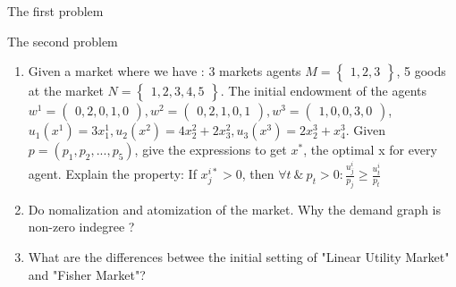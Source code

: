 
\theoremstyle{definition}
\usepackage[margin=1in]{geometry}
\newcommand{\br}{{\sf 2D-BROUWER}}
\newcommand{\brs}{{\sf 2D-BROUWER*}}

\def\duedate{Submit on 23:59:59 November 7, 2017}

\midterm

The first problem

The second problem

\begin{enumerate}
\item Given a market where we have :
$3$ markets agents $ M = \begin{Bmatrix} 1,2,3 \end{Bmatrix}$,
5 goods at the market $ N = \begin{Bmatrix} 1,2,3,4,5 \end{Bmatrix}$.
The initial endowment of the agents
$ w^1 = \begin{pmatrix} 0, 2, 0, 1, 0 \end{pmatrix},
w^2 = \begin{pmatrix} 0, 2, 1, 0, 1 \end{pmatrix},
w^3 = \begin{pmatrix} 1, 0, 0, 3, 0 \end{pmatrix}$,
$u_1(x^1) = 3x_1^1, u_2(x^2) = 4x_2^2 + 2x_3^2, u_3(x^3) = 2x_2^3 + x_4^3$.
Given $p = (p_1,p_2,...,p_5)$, give the expressions to get $x^*$, the optimal x for every agent.
Explain the property: If $x_j^{i*} >0$, then $\forall t \ \&  \ p_t > 0: \frac{u_j^i}{p_j} \ge \frac{u_t^i}{p_t}$
\item Do nomalization and atomization of the market. Why the demand graph is non-zero indegree ?
\item What are the differences betwee the initial setting of "Linear Utility Market" and "Fisher Market"?
\end{enumerate}


